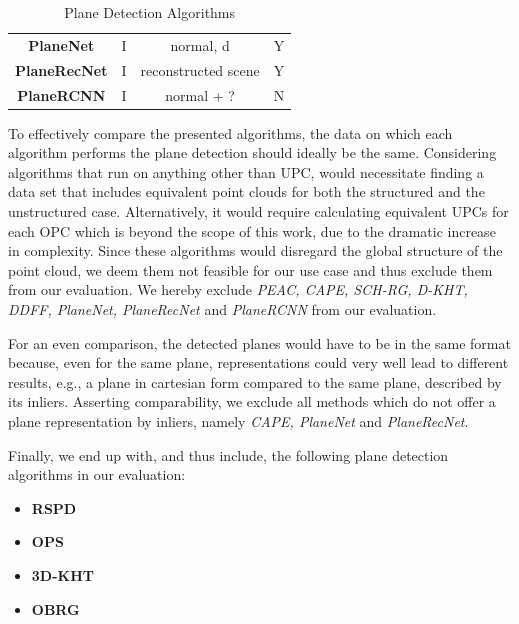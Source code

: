 \documentclass[main.tex]{subfiles}
\begin{document}
\begin{table}[H]
\begin{tabular}{c|c|c|c}
        \textbf{PlaneNet} \cite{Liu_Yang_Ceylan_Yumer_Furukawa_2018}     & I                   & normal, d             & Y                       \\ %
        \textbf{PlaneRecNet} \cite{Xie_Shu_Rambach_Pagani_Stricker_2022} & I                   & reconstructed scene   & Y                       \\ %
        \textbf{PlaneRCNN} \cite{Liu_Kim_Gu_Furukawa_Kautz_2019}         & I                   & normal + ?            & N                       \\ %
    \end{tabular}
    \caption{Plane Detection Algorithms}
    \label{tab:algos}
\end{table}


To effectively compare the presented algorithms, the data on which each algorithm performs the plane detection should ideally be the same.
Considering algorithms that run on anything other than UPC, would necessitate finding a data set that includes equivalent point clouds for both the structured and the unstructured case. %
Alternatively, it would require calculating equivalent UPCs for each OPC which is beyond the scope of this work, due to the dramatic increase in complexity.
Since these algorithms would disregard the global structure of the point cloud, we deem them not feasible for our use case and thus exclude them from our evaluation.
We hereby exclude  \textit{PEAC, CAPE, SCH-RG, D-KHT, DDFF, PlaneNet, PlaneRecNet} and \textit{PlaneRCNN} from our evaluation.

For an even comparison, the detected planes would have to be in the same format because, even for the same plane, representations could very well lead to different results, e.g., a plane in cartesian form compared to the same plane, described by its inliers.
Asserting comparability, we exclude all methods which do not offer a plane representation by inliers, namely \textit{CAPE, PlaneNet} and \textit{PlaneRecNet}.


Finally, we end up with, and thus include, the following plane detection algorithms in our evaluation:

\begin{itemize}
    \item \textbf{RSPD}
    \item \textbf{OPS}
    \item \textbf{3D-KHT}
    \item \textbf{OBRG}
\end{itemize}
\end{document}
